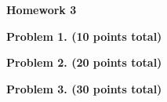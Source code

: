 \documentclass[epsfig]{article}
\def\bpar{\vskip26pt}
\def\npar{\vskip13pt}
\def\spar{\vskip10pt}
\begin{document}
\parindent=0pt


\null\bpar
\centerline{\bf Homework 3}
\npar

\npar



\bpar
{\bf Problem 1. (10 points total)}
\spar

{\bf Problem 2. (20 points total)}
\spar

{\bf Problem 3. (30 points total)}
\spar
\end{document}

